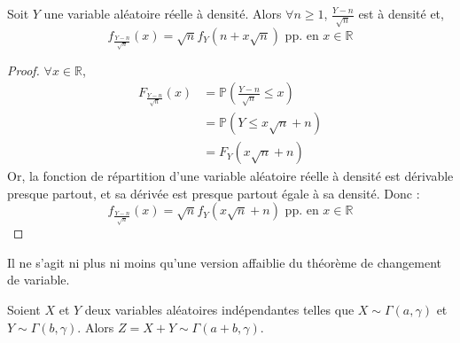 




	\begin{lemma}
		\label{formule-de-stirling-1}
		Soit $Y$ une variable aléatoire réelle à densité. Alors $\forall n \geq 1$, $\frac{Y - n}{\sqrt{n}}$ est à densité et,
		\[ f_{\frac{Y - n}{\sqrt{n}}}(x) = \sqrt{n} f_{Y}(n + x \sqrt{n}) \text{ pp. en } x \in \mathbb{R} \]
	\end{lemma}

	\begin{proof}
		$\forall x \in \mathbb{R}$,
		\begin{align*}
			F_{\frac{Y - n}{\sqrt{n}}}(x) & = \mathbb{P} \left(\frac{Y - n}{\sqrt{n}} \leq x \right) \\
			&= \mathbb{P} (Y \leq x \sqrt{n} + n) \\
			&= F_Y (x \sqrt{n} + n)
		\end{align*}
		Or, la fonction de répartition d'une variable aléatoire réelle à densité est dérivable presque partout, et sa dérivée est presque partout égale à sa densité. Donc :
		\[ f_{\frac{Y - n}{\sqrt{n}}}(x) = \sqrt{n} f_Y (x \sqrt{n} + n) \text{ pp. en } x \in \mathbb{R} \]
	\end{proof}

	\begin{remark}
		Il ne s'agit ni plus ni moins qu'une version affaiblie du théorème de changement de variable.
	\end{remark}


	\begin{lemma}
		\label{formule-de-stirling-2}
		Soient $X$ et $Y$ deux variables aléatoires indépendantes telles que $X \sim \Gamma(a, \gamma)$ et $Y \sim \Gamma(b, \gamma)$. Alors $Z = X + Y \sim \Gamma(a+b, \gamma)$.
	\end{lemma}

